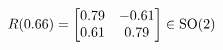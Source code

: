 \documentclass[preview]{standalone}
\begin{document}
\begin{align*}
\special{dvisvgm:raw <g id='unique000'>}R(0.66) = \begin{bmatrix} 0.79 & -0.61 \\ 0.61 & 0.79 \end{bmatrix} \in \text{SO}(2)\special{dvisvgm:raw </g>}
\end{align*}
\end{document}
